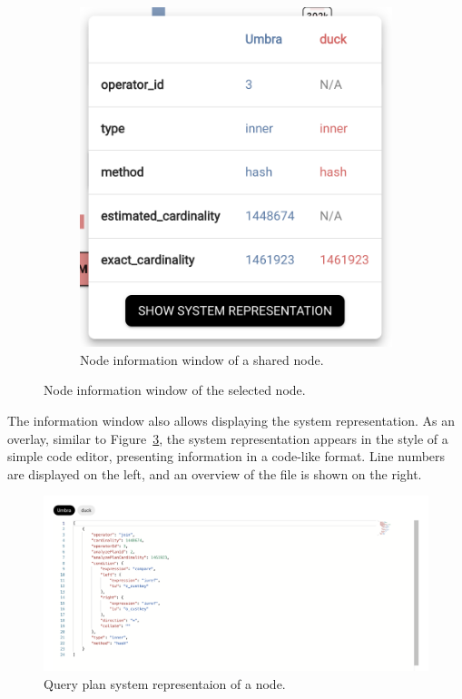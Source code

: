 \begin{figure}[h]
\begin{subfigure}[b]{0.4\linewidth}
      \includegraphics[width=0.8\linewidth]{figures/query-plan-node-info-combined.png}
      \caption{Node information window of a shared node.}
      \label{fig:query-plan-node-info-combined}
  \end{subfigure}
  \caption{Node information window of the selected node.}
  \label{fig:query-plan-node-info}
\end{figure}

The information window also allows displaying the system representation. As an overlay, similar to Figure~\ref{fig:query-plan-system-representation}, the system representation appears in the style of a simple code editor, presenting information in a code-like format. Line numbers are displayed on the left, and an overview of the file is shown on the right.

\begin{figure}[h]
  \centering
  \includegraphics[width=0.8\linewidth]{figures/query-plan-node-system-representation-combined.png}
  \caption{Query plan system representaion of a node.}
  \label{fig:query-plan-system-representation}
\end{figure}

